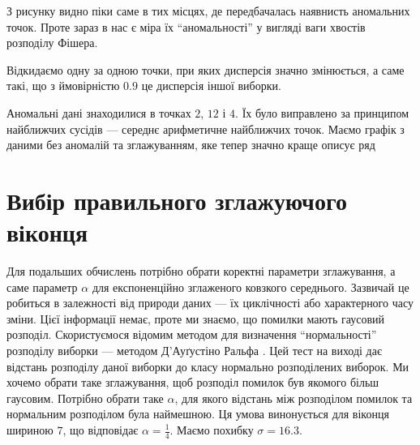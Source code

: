 З рисунку видно піки саме в тих місцях,
де передбачалась наявнисть аномальних точок.
Проте зараз в нас є міра їх ``аномальності''
у вигляді ваги хвостів розподілу Фішера.
\begin{center}
\end{center}

Відкидаємо одну за одною точки, при яких дисперсія значно змінюється,
а саме такі, що з ймовірністю $0.9$ це дисперсія іншої виборки.

\begin{center}
\end{center}

\begin{center}
\end{center}

\begin{center}
\end{center}

\begin{center}
\end{center}

Аномальні дані знаходилися в точках $2$, $12$ і $4$.
Їх було виправлено за принципом найближчих сусідів ---
середнє арифметичне найближчих точок.
Маємо графік з даними без аномалій та зглажуванням,
яке тепер значно краще описує ряд

\begin{center}
\end{center}

\section{Вибір правильного зглажуючого віконця}

Для подальших обчислень потрібно обрати коректні параметри зглажування,
а саме параметр $\alpha$ для експоненційно зглаженого ковзкого середнього.
Зазвичай це робиться в залежності від природи даних ---
їх циклічності або характерного часу зміни.
Цієї інформації немає, проте ми знаємо, що помилки мають гаусовий розподіл.
Скористуємося відомим методом
для визначення ``нормальності'' розподілу виборки ---
методом Д'Ауґустіно Ральфа \cite{dago1990}.
Цей тест на виході дає відстань розподілу даної виборки
до класу нормально розподілених виборок.
Ми хочемо обрати таке зглажування,
щоб розподіл помилок був якомого більш гаусовим.
Потрібно обрати таке $\alpha$,
для якого відстань між розподілом помилок та нормальним розподілом
була наймешною.
Ця умова винонується для віконця шириною $7$,
що відповідає $\alpha = \frac{1}{4}$.
Маємо похибку $\sigma = 16.3$.

\begin{center}
\end{center}
